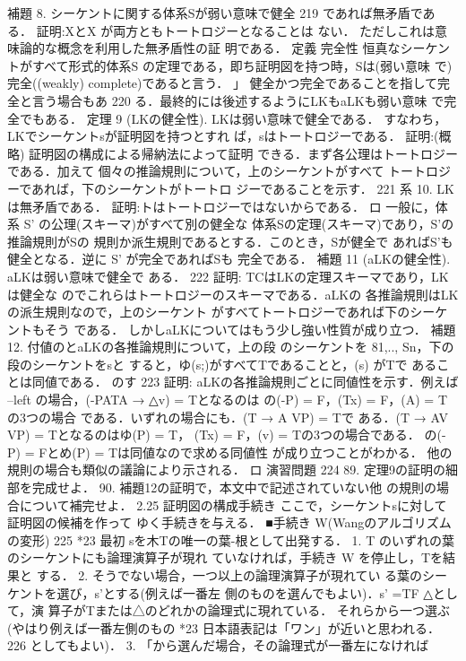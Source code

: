 \documentclass{ltjsarticle}
\theoremstyle{mystyle1}
\theoremstyle{mystyle2}
\begin{document}
補題 8. シーケントに関する体系Sが弱い意味で健全
219
であれば無矛盾である．
証明:XとX が両方ともトートロジーとなることは
ない．
ただしこれは意味論的な概念を利用した無矛盾性の証 明である．
定義 完全性 恒真なシーケントがすべて形式的体系S の定理である，即ち証明図を持つ時，Sは(弱い意味 で)完全((weakly) complete)であると言う． 」
健全かつ完全であることを指して完全と言う場合もあ
220
る．最終的には後述するようにLKもaLKも弱い意味 で完全でもある．
定理 9 (LKの健全性). LKは弱い意味で健全である． すなわち，LKでシーケントsが証明図を持つとすれ ば，sはトートロジーである．
証明:(概略) 証明図の構成による帰納法によって証明 できる．まず各公理はトートロジーである．加えて 個々の推論規則について，上のシーケントがすべて トートロジーであれば，下のシーケントがトートロ ジーであることを示す．
221
系 10. LKは無矛盾である．
証明:トはトートロジーではないからである．
ロ
一般に，体系 S' の公理(スキーマ)がすべて別の健全な 体系Sの定理(スキーマ)であり，S'の推論規則がSの 規則か派生規則であるとする．このとき，Sが健全で あればS'も健全となる．逆に S' が完全であればSも 完全である．
補題 11 (aLKの健全性). aLKは弱い意味で健全で ある．
222
証明: TCはLKの定理スキーマであり，LKは健全な のでこれらはトートロジーのスキーマである．aLKの 各推論規則はLKの派生規則なので，上のシーケント がすべてトートロジーであれば下のシーケントもそう である．
しかしaLKについてはもう少し強い性質が成り立つ．
補題 12. 付値のとaLKの各推論規則について，上の段 のシーケントを 81,.., Sn，下の段のシーケントをsと すると，ゆ(s;)がすべてTであることと，(s) がTで あることは同値である．
のす
223
証明: aLKの各推論規則ごとに同値性を示す．例えば --left の場合，(-PATA → △v) = Tとなるのは の(-P) = F，(Tx) = F，(A) = Tの3つの場合 である．いずれの場合にも．(T → A VP) = Tで ある．(T → AV VP) = Tとなるのはゆ(P) = T，
(Tx) = F，(v) = Tの3つの場合である． の(-P) = Fとめ(P) = Tは同値なので求める同値性 が成り立つことがわかる． 他の規則の場合も類似の議論により示される． ロ
演習問題
224
89. 定理9の証明の細部を完成せよ． 90. 補題12の証明で，本文中で記述されていない他
の規則の場合について補完せよ．
2.25 証明図の構成手続き ここで，シーケントsに対して証明図の候補を作って ゆく手続きを与える．
■手続き W(Wangのアルゴリズムの変形)
225
*23 最初 sを木Tの唯一の葉-根として出発する． 1. T のいずれの葉のシーケントにも論理演算子が現れ
ていなければ，手続き W を停止し，Tを結果と する． 2. そうでない場合，一つ以上の論理演算子が現れてい
る葉のシーケントを選び，s'とする(例えば一番左 側のものを選んでもよい)．s' =TF △として，演 算子がTまたは△のどれかの論理式に現れている． それらから一つ選ぶ(やはり例えば一番左側のもの
*23 日本語表記は「ワン」が近いと思われる．
226
としてもよい)． 3. 「から選んだ場合，その論理式が一番左になければ
\end{document}

